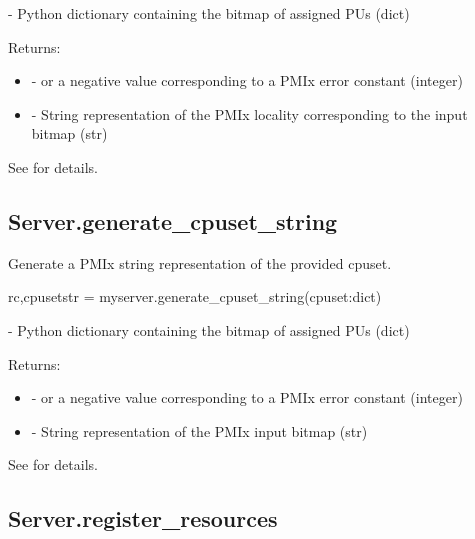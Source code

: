\begin{arglist}
 - Python  dictionary containing the bitmap of assigned \acp{PU} (dict)
\end{arglist}

Returns:

\begin{itemize}
    \item {} -  or a negative value corresponding to a PMIx error constant (integer)
    \item {} - String representation of the \ac{PMIx} locality corresponding to the input bitmap (str)
\end{itemize}

See  for details.


\subsection{Server.generate_cpuset_string}

\summary
Generate a \ac{PMIx} string representation of the provided cpuset.

\format

\pyspecificstart
\begin{codepar}
rc,cpusetstr = myserver.generate_cpuset_string(cpuset:dict)
\end{codepar}
\pyspecificend


\begin{arglist}
 - Python  dictionary containing the bitmap of assigned \acp{PU} (dict)
\end{arglist}

Returns:

\begin{itemize}
    \item {} -  or a negative value corresponding to a PMIx error constant (integer)
    \item {} - String representation of the \ac{PMIx} input bitmap (str)
\end{itemize}

See  for details.


\subsection{Server.register_resources}

